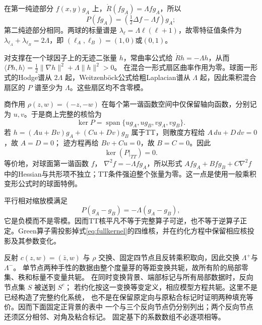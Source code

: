 \documentclass[UTF8,a4paper,11pt,fontset=fandol]{ctexart}
\numberwithin{equation}{section}
\theoremstyle{definition}
\begin{document}
在第一纯迹部分 $f(x,y)g_A$ 上，$\mathring R(fg_A)=\Lambda fg_A$，所以
\[
P(fg_A)=\left(\tfrac12\Delta f-\Lambda f\right)g_A;
\]
第二纯迹部分相同。两球的标量谱是
$\lambda_\ell=\Lambda\ell(\ell+1)$，故零特征值条件为
$\lambda_{\ell_A}+\lambda_{\ell_B}=2\Lambda$，即
$(\ell_A,\ell_B)=(1,0)$或$(0,1)$。

对支撑在一个球因子上的无迹二张量 $h$，常曲率公式给
$\mathring Rh=-\Lambda h$，从而
$\langle Ph,h\rangle=\frac12\|\nabla h\|^2+\Lambda\|h\|^2>0$。
在混合一形式扇区曲率作用为零。球面一形式的Hodge谱从 $2\Lambda$ 起，Weitzenböck公式给粗Laplacian谱从 $\Lambda$ 起，因此乘积混合扇区的 $P$ 谱至少为 $\Lambda$。这些扇区均不含零模。

商作用 $\rho(z,w)=(-z,-w)$ 在每个第一谐函数空间中仅保留轴向函数，分别记为 $u,v$。于是商上完整的核恰为
\begin{equation}\label{eq:fullkernel}
\ker P=\operatorname{span}\{ug_A,ug_B,vg_A,vg_B\}.
\end{equation}
若
$h=(Au+Bv)g_A+(Cu+Dv)g_B$
属于TT，则散度方程给 $A\,du+D\,dv=0$，故 $A=D=0$；
迹方程再给 $Bv+Cu=0$，故 $B=C=0$。因此
\begin{equation}\label{eq:ttkernel}
\ker(P|_{TT})=0.
\end{equation}
等价地，对球面第一谐函数 $f$，
$\nabla^2f=-\Lambda fg_A$，所以形式
$Afg_A+Bfg_B+C\nabla^2f$
中的Hessian与共形项不独立；TT条件强迫整个张量为零。这一点是使用一般乘积变形公式\cite{Kroncke}时的球面特例。

平行相对缩放模满足
\[
P(g_A-g_B)=-\Lambda(g_A-g_B),
\]
它是负模而不是零模。因而TT核平凡不等于完整算子可逆，也不等于逆算子正定。Green算子需投影掉式\eqref{eq:fullkernel}的四维核，并在约化方程中保留相应核投影及其参数变化。

反射 $c(z,w)=(\bar z,w)$ 与 $\rho$ 交换、固定四节点且反转乘积取向，因此交换 $\Lambda^+$与$\Lambda^-$。
单节点两种手性的数据由整个度量芽的等距变换共轭，故所有阶的局部零集、秩和标量不变量共轭。
在同时变换背景、端部标记与所有局部数据时，反向节点集 $S$ 被送到 $S^c$；
若约化按这一变换等变定义，相应模型方程共轭。这里不是已经构造了完整约化系统，
也不是在保留原定向与原粘合标记时证明两种填充等价。因而下面固定正背景的表中
一个与三个反向节点仍分别列出；两个反向节点还须区分相邻、对角及粘合标记。
固定基下的系数数组不必逐项相等。
\end{document}

